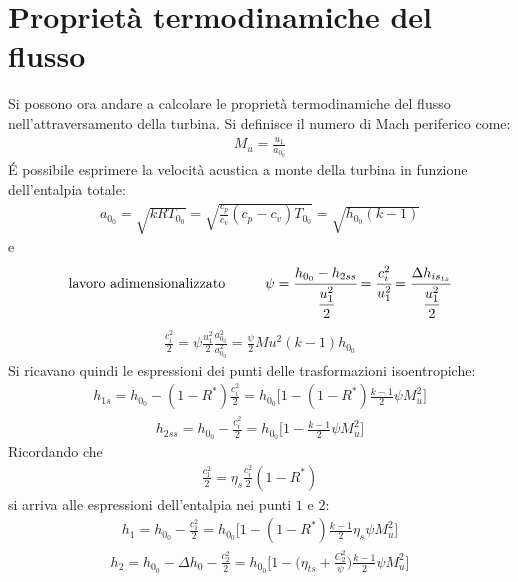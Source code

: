 \section{Proprietà termodinamiche del flusso}
Si possono ora andare a calcolare le proprietà termodinamiche del flusso nell'attraversamento della turbina. Si definisce il numero di Mach periferico come:
\begin{align*}
M_u = \frac{u_1}{a_{0_0}}
\end{align*}
\'E possibile esprimere la velocità acustica a monte della turbina in funzione dell'entalpia totale:
\begin{align*}
a_{0_0} = \sqrt{kRT_{0_0}} = \sqrt{\frac{c_p}{c_v} \left( c_p - c_v \right) T_{0_0}} = \sqrt{h_{0_0} \left( k - 1 \right)}
\end{align*}
e
\begin{align*}
\mbox{lavoro adimensionalizzato} \hspace{1cm} \psi = \cfrac{h_{0_0} - h_{2ss}}{\cfrac{u_1^2}{2}} = \cfrac{c_i^2}{u_1^2} = \cfrac{\Delta h_{is_{ts}}}{\cfrac{u_1^2}{2}}
\end{align*}
\begin{align*}
\frac{c_i^2}{2} = \psi \frac{u_1^2}{2} \frac{a_{0_0}^2}{a_{0_0}^2} = \frac{\psi}{2} Mu^2 (k-1) h_{0_0}
\end{align*}
Si ricavano quindi le espressioni dei punti delle trasformazioni isoentropiche:
\begin{align*}
h_{1s} = h_{0_0} - \left(1- R^* \right) \frac{c_i^2}{2} = h_{0_0} \bigg[ 1- \left( 1- R^* \right) \frac{k-1}{2} \psi M_u^2 \bigg]
\end{align*}
\begin{align*}
h_{2ss} = h_{0_0} - \frac{c_i^2}{2} = h_{0_0} \bigg[ 1 - \frac{k-1}{2} \psi M_u^2 \bigg]
\end{align*}
Ricordando che
\begin{align*}
\frac{c_1^2}{2} = \eta_s \frac{c_i^2}{2} \left( 1- R^* \right)
\end{align*}
si arriva alle espressioni dell'entalpia nei punti $1$ e $2$:
\begin{align*}
h_1 = h_{0_0} - \frac{c_1^2}{2} = h_{0_0} \bigg[ 1- \left( 1- R^* \right) \frac{k-1}{2} \eta_s \psi M_u^2 \bigg]
\end{align*}
\begin{align*}
h_2 = h_{0_0} - \Delta h_0 - \frac{c_2^2}{2} = h_{0_0} \bigg[ 1- \bigg( \eta_{ts} + \frac{C_2^2}{\psi} \bigg) \frac{k-1}{2} \psi M_u^2 \bigg]
\end{align*}

